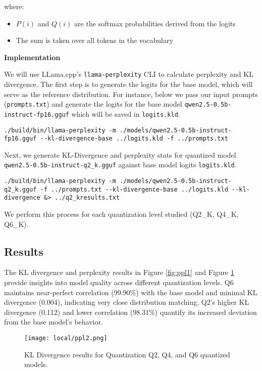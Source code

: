 where:
\begin{itemize}
\item $P(i)$ and $Q(i)$ are the softmax probabilities derived from the logits
\item The sum is taken over all tokens in the vocabulary
\end{itemize}

\textbf{Implementation}

We will use LLama.cpp's \texttt{llama-perplexity} CLI to calculate perplexity and KL divergence. The first step is to generate the logits for the base model, which will serve as the reference distribution. For instance, below we pass our input prompts (\texttt{prompts.txt}) and generate the logits for the base model \texttt{qwen2.5-0.5b-instruct-fp16.gguf} which will be saved in \texttt{logits.kld}.

\begin{verbatim}
./build/bin/llama-perplexity -m ./models/qwen2.5-0.5b-instruct-fp16.gguf --kl-divergence-base ../logits.kld -f ../prompts.txt
\end{verbatim}

Next, we generate KL-Divergence and perplexity stats for quantized model \texttt{qwen2.5-0.5b-instruct-q2\_k.gguf} against base model logits \texttt{logits.kld}.

\begin{verbatim}
./build/bin/llama-perplexity -m ./models/qwen2.5-0.5b-instruct-q2_k.gguf -f ../prompts.txt --kl-divergence-base ../logits.kld --kl-divergence &> ../q2_kresults.txt
\end{verbatim}

We perform this process for each quantization level studied (Q2\_K, Q4\_K, Q6\_K).

\subsection{Results}

The KL divergence and perplexity results in Figure \ref{fig:ppl1} and Figure \ref{fig:ppl2} provide insights into model quality across different quantization levels. Q6 maintains near-perfect correlation (99.90\%) with the base model and minimal KL divergence (0.004), indicating very close distribution matching. Q2's higher KL divergence (0.112) and lower correlation (98.31\%) quantify its increased deviation from the base model's behavior.

\begin{figure}[H]
\centering
\texttt{[image: local/ppl2.png]}
\caption{KL Divergence results for Quantization Q2, Q4, and Q6 quantized models.}
\label{fig:ppl2}
\end{figure}

